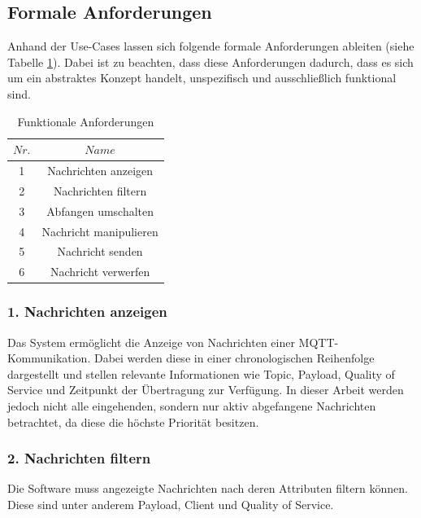    \subsection{Formale Anforderungen} \label{FormaleAnforderungen}
    Anhand der Use-Cases lassen sich folgende formale Anforderungen ableiten (siehe Tabelle \ref{tab:functional_requirements}).
    Dabei ist zu beachten, dass diese Anforderungen dadurch, dass es sich um ein abstraktes Konzept handelt, unspezifisch und ausschließlich funktional sind.
    \begin{table}[h]
        \centering
        \begin{tabular}{c|c}
            \hline
            $Nr.$ & $Name$ \\ \hline
            1 & Nachrichten anzeigen \\ \hline
            2 & Nachrichten filtern \\ \hline
            3 & Abfangen umschalten \\ \hline
            4 & Nachricht manipulieren \\ \hline
            5 & Nachricht senden \\ \hline
            6 & Nachricht verwerfen \\ \hline
        \end{tabular}
        \caption{Funktionale Anforderungen}
        \label{tab:functional_requirements}
    \end{table}
    
        \subsubsection{1. Nachrichten anzeigen}
        Das System ermöglicht die Anzeige von Nachrichten einer \ac{MQTT}-Kommunikation.
        Dabei werden diese in einer chronologischen Reihenfolge dargestellt und stellen relevante Informationen wie Topic, Payload, Quality of Service und Zeitpunkt der Übertragung zur Verfügung.
        In dieser Arbeit werden jedoch nicht alle eingehenden, sondern nur aktiv abgefangene Nachrichten betrachtet, da diese die höchste Priorität besitzen.
        
        \subsubsection{2. Nachrichten filtern}
        Die Software muss angezeigte Nachrichten nach deren Attributen filtern können. Diese sind unter anderem \glqq Payload\grqq{}, \glqq Client\grqq{} und \glqq Quality of Service\grqq{}.
        
